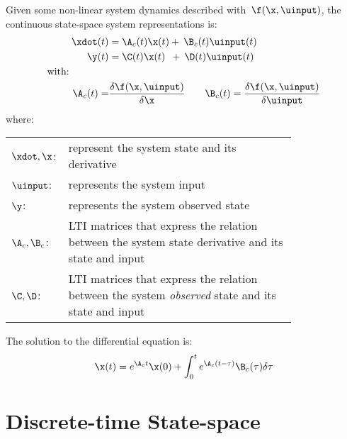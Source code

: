 Given some non-linear system dynamics described with~${\f(\x,\uinput)}$, the
continuous state-space system representations is:
\begin{align}
  \xdot(t) &= \A_c(t) \x(t) + \: \B_c(t)\uinput(t) \label{eqn:ss_differential}\\
  \y(t) &= \C(t) \x(t) \:\; + \: \D(t)\uinput(t) \label{eqn:ss_continuous_observer}\\
  \text{with:} \qquad \qquad& \nonumber \\
  \A_c(t)=&\frac{\delta \f(\x,\uinput)}{\delta \x}  \qquad\B_c(t)=\frac{\delta \f(\x,\uinput)}{\delta \uinput}
\end{align}
where:
\begin{tabularx}{\linewidth}{>{\raggedleft\arraybackslash}X>{\raggedright\arraybackslash}p{0.8\linewidth}}
  ${\xdot, \x}$: & represent the system state and its derivative \tabularnewline
  $\uinput$:& represents the system input \tabularnewline
  $\y$: & represents the system observed state  \tabularnewline
  ${\A_c,\B_c}$: &LTI matrices that express the relation between the system state derivative and its state and input \tabularnewline
    ${\C,\D }$: &LTI matrices that express the relation between the system \emph{observed} state and its state and input
\end{tabularx}

The solution to the differential equation is:
\begin{gather}
  \x(t) = e^{\A_ct}\x(0) + \int_{0}^{t}e^{\A_c(t-\tau)}\B_c(\tau)\delta\tau \label{eqn:ss_solution}
\end{gather}

\section{Discrete-time State-space}

